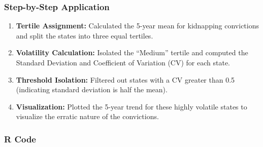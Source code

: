 \documentclass[
]{article}
\providecommand{\tightlist}{%
  \setlength{\itemsep}{0pt}\setlength{\parskip}{0pt}}
\begin{document}
\subsubsection{Step-by-Step
Application}\label{step-by-step-application-3}

\begin{enumerate}
\def\labelenumi{\arabic{enumi}.}
\tightlist
\item
  \textbf{Tertile Assignment:} Calculated the 5-year mean for kidnapping
  convictions and split the states into three equal tertiles.
\item
  \textbf{Volatility Calculation:} Isolated the ``Medium'' tertile and
  computed the Standard Deviation and Coefficient of Variation (CV) for
  each state.
\item
  \textbf{Threshold Isolation:} Filtered out states with a CV greater
  than 0.5 (indicating standard deviation is half the mean).
\item
  \textbf{Visualization:} Plotted the 5-year trend for these highly
  volatile states to visualize the erratic nature of the convictions.
\end{enumerate}

\subsubsection{R Code}\label{r-code-3}
\end{document}
